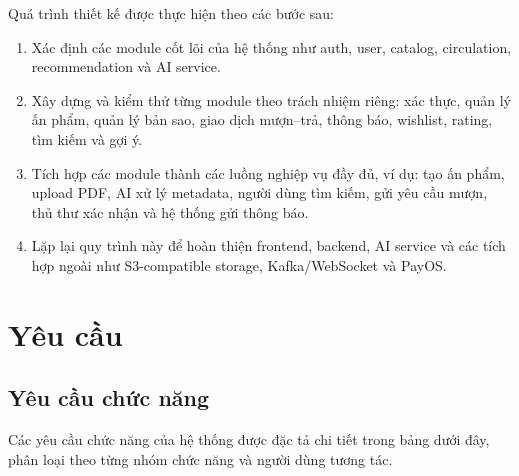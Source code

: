 Quá trình thiết kế được thực hiện theo các bước sau:
\begin{enumerate}
    \item Xác định các module cốt lõi của hệ thống như auth, user, catalog, circulation, recommendation và AI service.
    \item Xây dựng và kiểm thử từng module theo trách nhiệm riêng: xác thực, quản lý ấn phẩm, quản lý bản sao, giao dịch mượn--trả, thông báo, wishlist, rating, tìm kiếm và gợi ý.
    \item Tích hợp các module thành các luồng nghiệp vụ đầy đủ, ví dụ: tạo ấn phẩm, upload PDF, AI xử lý metadata, người dùng tìm kiếm, gửi yêu cầu mượn, thủ thư xác nhận và hệ thống gửi thông báo.
    \item Lặp lại quy trình này để hoàn thiện frontend, backend, AI service và các tích hợp ngoài như S3-compatible storage, Kafka/WebSocket và PayOS.
\end{enumerate}
\newpage
\section{Yêu cầu}
\label{sec:YeuCau}

\subsection{Yêu cầu chức năng}
\label{subsec:YeuCauChucNang}
Các yêu cầu chức năng của hệ thống được đặc tả chi tiết trong bảng dưới đây, phân loại theo từng nhóm chức năng và người dùng tương tác.

